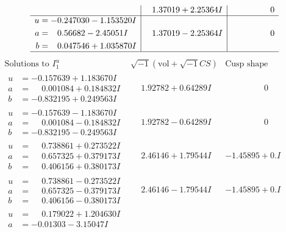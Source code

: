 \documentclass[1p]{elsarticle_modified}
\theoremstyle{definition}
\newcommand{\I}{\sqrt{-1}}
\begin{document}
$$\begin{array}{c|c|c}
 & \phantom{-}1.37019 + 2.25364 I & \phantom{-0.000000 } 0 \\ \hline\begin{aligned}
u &= -0.247030 - 1.153520 I \\
a &= \phantom{-}0.56682 - 2.45051 I \\
b &= \phantom{-}0.047546 + 1.035870 I\end{aligned}
 & \phantom{-}1.37019 - 2.25364 I & \phantom{-0.000000 } 0\\
 \hline 
 \end{array}$$\newpage$$\begin{array}{c|c|c}  
\text{Solutions to }I^u_{1}& \I (\text{vol} + \sqrt{-1}CS) & \text{Cusp shape}\\
 \hline 
\begin{aligned}
u &= -0.157639 + 1.183670 I \\
a &= \phantom{-}0.001084 + 0.184832 I \\
b &= -0.832195 + 0.249563 I\end{aligned}
 & \phantom{-}1.92782 + 0.64289 I & \phantom{-0.000000 } 0 \\ \hline\begin{aligned}
u &= -0.157639 - 1.183670 I \\
a &= \phantom{-}0.001084 - 0.184832 I \\
b &= -0.832195 - 0.249563 I\end{aligned}
 & \phantom{-}1.92782 - 0.64289 I & \phantom{-0.000000 } 0 \\ \hline\begin{aligned}
u &= \phantom{-}0.738861 + 0.273522 I \\
a &= \phantom{-}0.657325 + 0.379173 I \\
b &= \phantom{-}0.406156 + 0.380173 I\end{aligned}
 & \phantom{-}2.46146 + 1.79544 I & -1.45895 + 0. I\phantom{ +0.000000I} \\ \hline\begin{aligned}
u &= \phantom{-}0.738861 - 0.273522 I \\
a &= \phantom{-}0.657325 - 0.379173 I \\
b &= \phantom{-}0.406156 - 0.380173 I\end{aligned}
 & \phantom{-}2.46146 - 1.79544 I & -1.45895 + 0. I\phantom{ +0.000000I} \\ \hline\begin{aligned}
u &= \phantom{-}0.179022 + 1.204630 I \\
a &= -0.01303 - 3.15047 I \\

\end{aligned}
\end{array}$$
\end{document}
